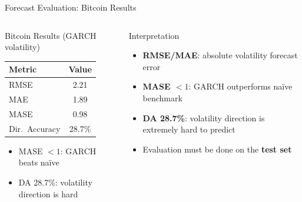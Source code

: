 \documentclass[9pt, aspectratio=169, t]{beamer}
\begin{document}
\begin{frame}{Forecast Evaluation: Bitcoin Results}
    \begin{columns}[T]
        \begin{alertblock}{Bitcoin Results (GARCH volatility)}
            \begin{tabular}{lc}
                \textbf{Metric} & \textbf{Value} \\
                \midrule
                RMSE & 2.21 \\
                MAE & 1.89 \\
                MASE & 0.98 \\
                Dir.\ Accuracy & 28.7\% \\
            \end{tabular}
            \vspace{0.2cm}
            \begin{itemize}\setlength{\itemsep}{2pt}
                \item MASE $< 1$: GARCH beats naïve
                \item DA 28.7\%: volatility direction is hard
            \end{itemize}
        \end{alertblock}

        \begin{block}{Interpretation}
            \begin{itemize}\setlength{\itemsep}{4pt}
                \item \textbf{RMSE/MAE}: absolute volatility forecast error
                \item \textbf{MASE $< 1$}: GARCH outperforms naïve benchmark
                \item \textbf{DA 28.7\%}: volatility direction is extremely hard to predict
                \item Evaluation must be done on the \textbf{test set}
            \end{itemize}
        \end{block}
    \end{columns}
\end{frame}
\end{document}

